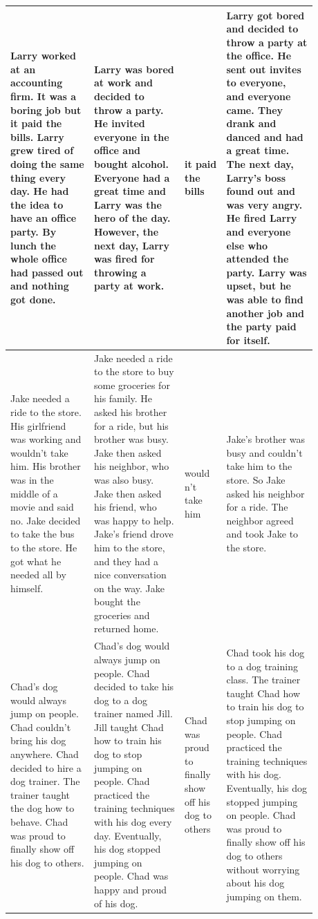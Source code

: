 \begin{table}[htp!]
\begin{tabular}{|p{0.24\linewidth}|p{0.26\linewidth}|p{0.12\linewidth}|p{0.26\linewidth}|}
Larry worked at an accounting firm. It was a boring job but it paid the bills. Larry grew tired of doing the same thing every day. He had the idea to have an office party. By lunch the whole office had passed out and nothing got done.
& Larry was bored at work and decided to throw a party. He invited everyone in the office and bought alcohol. Everyone had a great time and Larry was the hero of the day. However, the next day, Larry was fired for throwing a party at work.
& it paid the bills
& Larry got bored and decided to throw a party at the office. He sent out invites to everyone, and everyone came. They drank and danced and had a great time. The next day, Larry's boss found out and was very angry. He fired Larry and everyone else who attended the party. Larry was upset, but he was able to find another job and the party paid for itself. \\ \hline

Jake needed a ride to the store. His girlfriend was working and wouldn't take him. His brother was in the middle of a movie and said no. Jake decided to take the bus to the store. He got what he needed all by himself.
& Jake needed a ride to the store to buy some groceries for his family. He asked his brother for a ride, but his brother was busy. Jake then asked his neighbor, who was also busy. Jake then asked his friend, who was happy to help. Jake's friend drove him to the store, and they had a nice conversation on the way. Jake bought the groceries and returned home.
& would n't take him
& Jake's brother was busy and couldn't take him to the store. So Jake asked his neighbor for a ride. The neighbor agreed and took Jake to the store. \\ \hline

Chad's dog would always jump on people. Chad couldn't bring his dog anywhere. Chad decided to hire a dog trainer. The trainer taught the dog how to behave. Chad was proud to finally show off his dog to others.
& Chad's dog would always jump on people. Chad decided to take his dog to a dog trainer named Jill. Jill taught Chad how to train his dog to stop jumping on people. Chad practiced the training techniques with his dog every day. Eventually, his dog stopped jumping on people. Chad was happy and proud of his dog.
& Chad was proud to finally show off his dog to others
& Chad took his dog to a dog training class. The trainer taught Chad how to train his dog to stop jumping on people. Chad practiced the training techniques with his dog. Eventually, his dog stopped jumping on people. Chad was proud to finally show off his dog to others without worrying about his dog jumping on them. \\ \hline


\end{tabular}
\end{table}
